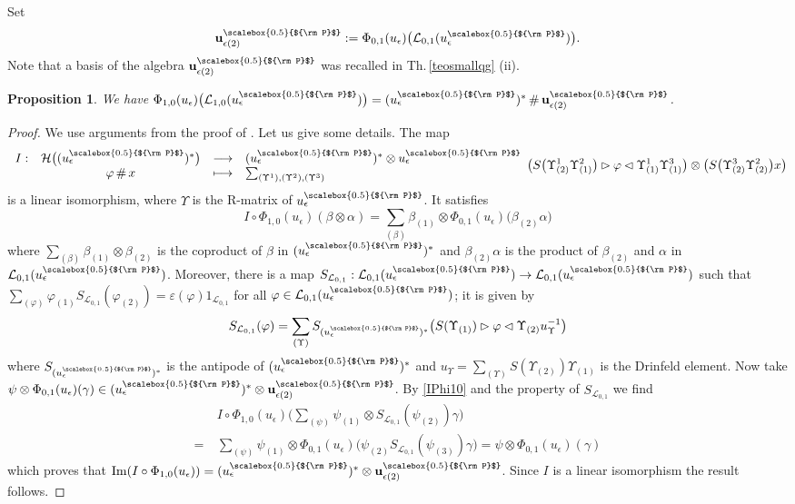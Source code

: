 \documentclass[11pt]{amsart}
\newtheorem{prop}[teo]{Proposition}
\newcommand{\fonc}[5]{                     %
            \begin{array}{rcll}#1 :& #2 & \longrightarrow & #3 \\   %
                         &#4 &\longmapsto & #5          %
            \end{array}}
\newcommand{\e}{\epsilon}
\newcommand{\Pup}{{\scalebox{0.5}{${\rm P}$}}}
\begin{document}
\indent Set
\[ {\bf u}_{\e (2)}^\Pup :=\Phi_{0,1}(u_\e)\bigl( \mathcal{L}_{0,1}(u_\e^\Pup) \bigr). \]
Note that a basis of the algebra ${\bf u}_{\e (2)}^\Pup$ was recalled in Th.\,\ref{teosmallqg} (ii).
\begin{prop}\label{Phi10image} We have $\Phi_{1,0}(u_\e)\bigl(\mathcal{L}_{1,0}(u_\e^\Pup)\bigr) =(u_\e^\Pup)^* \,\#\, {\bf u}_{\e (2)}^\Pup$.
\end{prop}
\begin{proof} We use arguments from the proof of \cite[Thm.\,3.13]{BFR}. Let us give some details. The map
\[ \fonc{I}{\mathcal{H}\bigl( (u_\e^\Pup)^* \bigr)}{(u_\e^\Pup)^* \otimes u_\e^\Pup}{\varphi \,\#\, x}{\sum_{(\Upsilon^1),(\Upsilon^2),(\Upsilon^3)}} \bigl(S\bigl( \Upsilon^1_{(2)} \Upsilon^2_{(1)} \bigr) \rhd \varphi \lhd \Upsilon^1_{(1)}\Upsilon^3_{(1)}\bigr) \otimes \bigl(S\bigl( \Upsilon^3_{(2)}\Upsilon^2_{(2)} \bigr)x\bigr) \]
is a linear isomorphism, where $\Upsilon$ is the R-matrix of $u_\e^\Pup$. It satisfies
\begin{equation}\label{IPhi10}
I \circ \Phi_{1,0}(u_\e)\left(\beta \otimes \alpha\right) = \sum_{(\beta)} \beta_{(1)} \otimes \Phi_{0,1}(u_\e)\bigl( \beta_{(2)}\alpha \bigr)
\end{equation}
where $\textstyle \sum_{(\beta)} \beta_{(1)} \otimes \beta_{(2)}$ is the coproduct of $\beta$ in $(u_\e^\Pup)^*$ and $\beta_{(2)}\alpha$ is the product of $\beta_{(2)}$ and $\alpha$ in $\mathcal{L}_{0,1}(u_\e^\Pup)$. Moreover, there is a map $S_{\mathcal{L}_{0,1}} : \mathcal{L}_{0,1}(u_\e^\Pup) \to \mathcal{L}_{0,1}(u_\e^\Pup)$ such that $\textstyle \sum_{(\varphi)} \varphi_{(1)} S_{\mathcal{L}_{0,1}}(\varphi_{(2)}) = \varepsilon(\varphi)1_{\mathcal{L}_{0,1}}$ for all $\varphi \in \mathcal{L}_{0,1}(u_\e^\Pup)$; it is given by
\[ S_{\mathcal{L}_{0,1}}(\varphi) = \sum_{(\Upsilon)} S_{(u_\e^\Pup)^*}\bigl( S(\Upsilon_{(1)}) \rhd \varphi \lhd \Upsilon_{(2)}u_\Upsilon^{-1} \bigr) \]
where $S_{(u_\e^\Pup)^*}$ is the antipode of $(u_\e^\Pup)^*$ and $\textstyle u_\Upsilon = \sum_{(\Upsilon)}S(\Upsilon_{(2)})\Upsilon_{(1)}$ is the Drinfeld element. Now take $\psi \otimes \Phi_{0,1}(u_\e)(\gamma) \in (u_\e^\Pup)^* \otimes {\bf u}_{\e (2)}^\Pup$. By \eqref{IPhi10} and the property of $S_{\mathcal{L}_{0,1}}$ we find
\begin{align*} 
&I \circ \Phi_{1,0}(u_\e)\biggl( \sum_{(\psi)} \psi_{(1)} \otimes S_{\mathcal{L}_{0,1}}(\psi_{(2)})\gamma \biggr)\\
=\:&\sum_{(\psi)} \psi_{(1)} \otimes \Phi_{0,1}(u_\e)\bigl(\psi_{(2)} S_{\mathcal{L}_{0,1}}(\psi_{(3)})\gamma\bigr) = \psi \otimes \Phi_{0,1}(u_\e)(\gamma)
\end{align*}
which proves that $\mathrm{Im}(I \circ \Phi_{1,0}(u_\e)) = (u_\e^\Pup)^* \otimes {\bf u}_{\e (2)}^\Pup$. Since $I$ is a linear isomorphism the result follows.
\end{proof}
\end{document}
